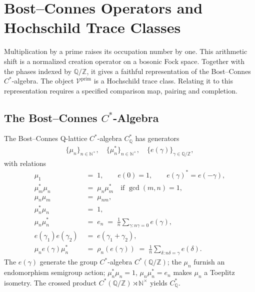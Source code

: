 \chapter{Bost--Connes Operators and Hochschild Trace Classes}
\label{v4-arith:connes-soibelman}

Multiplication by a prime raises its occupation number by one.
This arithmetic shift is a normalized creation operator on a bosonic
Fock space. Together with the phases indexed by
$\mathbb Q/\mathbb Z$, it gives a faithful representation of the
Bost--Connes $C^*$-algebra.
The object $\mathcal V^{\mathrm{prim}}$ is a Hochschild trace class.
Relating it to this representation requires a specified comparison map,
pairing and completion.

\section{The Bost--Connes \(C^{*}\)-Algebra}
\label{v4-arith:cs:bost-connes-explicit}

\begin{definition}
\label{v4-arith:def:bost-connes-algebra}
The Bost--Connes Q-lattice \(C^{*}\)-algebra \(C_{\mathbb{Q}}^{*}\) has
generators
\begin{align}
\{\mu_{n}\}_{n\in\mathbb{N}^{\times}},\quad
\{\mu_{n}^{*}\}_{n\in\mathbb{N}^{\times}},\quad
\{e(\gamma)\}_{\gamma\in\mathbb{Q}/\mathbb{Z}},
\end{align}
with relations
\begin{align}
\mu_1\;&=\;1,\qquad e(0)=1,\qquad e(\gamma)^*=e(-\gamma), \\
\mu_m^*\mu_n\;&=\;\mu_n\mu_m^*\quad\text{if }\gcd(m,n)=1, \\
\mu_{n}\mu_{m}\;&=\;\mu_{nm}, \\
\mu_{n}^{*}\mu_{n}\;&=\;1, \\
\mu_{n}\mu_{n}^{*}\;&=\;e_{n}\;=\;\frac{1}{n}\sum_{\gamma:n\gamma=0}e(\gamma), \\
e(\gamma_{1})e(\gamma_{2})\;&=\;e(\gamma_{1}+\gamma_{2}), \\
\mu_{n}e(\gamma)\mu_{n}^{*}\;&=\;\rho_{n}(e(\gamma))\;=\;\frac{1}{n}\sum_{\delta:n\delta=\gamma}e(\delta).
\end{align}
The \(e(\gamma)\) generate the group \(C^{*}\)-algebra
\(C^{*}(\mathbb{Q}/\mathbb{Z})\); the \(\mu_{n}\) furnish an endomorphism
semigroup action; \(\mu_{n}^{*}\mu_{n}=1\), \(\mu_{n}\mu_{n}^{*}=e_{n}\)
makes \(\mu_{n}\) a Toeplitz isometry. The crossed product
\(C^{*}(\mathbb{Q}/\mathbb{Z})\rtimes\mathbb{N}^{\times}\) yields
\(C_{\mathbb{Q}}^{*}\).
\end{definition}

